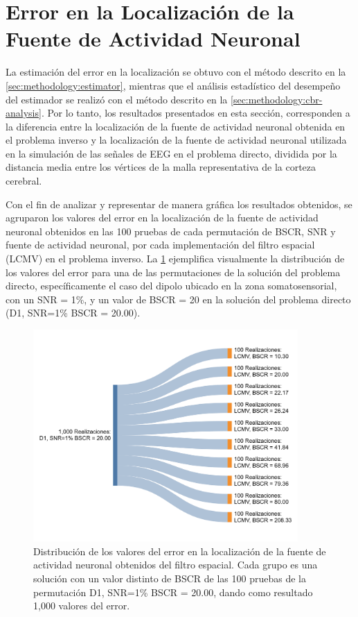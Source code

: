 \section{Error en la Localización de la Fuente de Actividad Neuronal}
\label{sec:results:error}

La estimación del error en la localización se obtuvo con el método descrito en la \cref{sec:methodology:estimator}, mientras que el análisis estadístico del desempeño del estimador se realizó con el método descrito en la \cref{sec:methodology:cbr-analysis}.
Por lo tanto, los resultados presentados en esta sección, corresponden a la diferencia entre la localización de la fuente de actividad neuronal obtenida en el problema inverso y la localización de la fuente de actividad neuronal utilizada en la simulación de las señales de EEG en el problema directo, dividida por la distancia media entre los vértices de la malla representativa de la corteza cerebral.

Con el fin de analizar y representar de manera gráfica los resultados obtenidos, se agruparon los valores del error en la localización de la fuente de actividad neuronal obtenidos en las 100 pruebas de cada permutación de BSCR, SNR y fuente de actividad neuronal, por cada implementación del filtro espacial (LCMV) en el problema inverso. 
La \cref{fig:individual-lod} ejemplifica visualmente la distribución de los valores del error para una de las permutaciones de la solución del problema directo, específicamente el caso del dipolo ubicado en la zona somatosensorial, con un SNR = 1\%, y un valor de BSCR = 20 en la solución del problema directo (D1, SNR=1\% BSCR = 20.00).

\begin{figure}[t]
    \centering
    \includegraphics[width=0.9\textwidth]{gfx/individual_lod.png}
    \caption{Distribución de los valores del error en la localización de la fuente de actividad neuronal obtenidos del filtro espacial. Cada grupo es una solución con un valor distinto de BSCR de las 100 pruebas de la permutación D1, SNR=1\% BSCR = 20.00, dando como resultado 1,000 valores del error.}
    \label{fig:individual-lod}
\end{figure}

